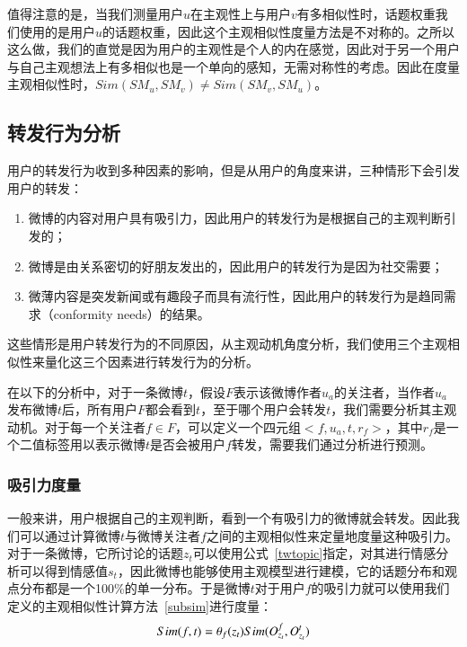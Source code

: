 值得注意的是，当我们测量用户$ u $在主观性上与用户$ v $有多相似性时，话题权重我们使用的是用户$ u $的话题权重，因此这个主观相似性度量方法是不对称的。之所以这么做，我们的直觉是因为用户的主观性是个人的内在感觉，因此对于另一个用户与自己主观想法上有多相似也是一个单向的感知，无需对称性的考虑。因此在度量主观相似性时，$ Sim(SM_u,SM_v)\neq Sim(SM_v,SM_u)$。

\subsection{转发行为分析}
\label{retweet}
用户的转发行为收到多种因素的影响，但是从用户的角度来讲，三种情形下会引发用户的转发：

\begin{enumerate}
\item 微博的内容对用户具有吸引力，因此用户的转发行为是根据自己的主观判断引发的；
\item 微博是由关系密切的好朋友发出的，因此用户的转发行为是因为社交需要；
\item 微薄内容是突发新闻或有趣段子而具有流行性，因此用户的转发行为是趋同需求（conformity needs）的结果。
\end{enumerate}
这些情形是用户转发行为的不同原因，从主观动机角度分析，我们使用三个主观相似性来量化这三个因素进行转发行为的分析。

在以下的分析中，对于一条微博$ t $，假设$ F $表示该微博作者$ u_{a} $的关注者，当作者$ u_{a} $发布微博$ t $后，所有用户$ F $都会看到$ t $，至于哪个用户会转发$ t $，我们需要分析其主观动机。对于每一个关注者$ f \in F $，可以定义一个四元组$ <f, u_{a}, t, r_{f}>  $，其中$ r_{f} $是一个二值标签用以表示微博$ t $是否会被用户$ f $转发，需要我们通过分析进行预测。

\subsubsection{吸引力度量}
一般来讲，用户根据自己的主观判断，看到一个有吸引力的微博就会转发。因此我们可以通过计算微博$ t $与微博关注者$ f $之间的主观相似性来定量地度量这种吸引力。对于一条微博，它所讨论的话题$ z_t $可以使用公式~\ref{twtopic}指定，对其进行情感分析可以得到情感值$ s_t $，因此微博也能够使用主观模型进行建模，它的话题分布和观点分布都是一个100\%的单一分布。于是微博$t$对于用户$f$的吸引力就可以使用我们定义的主观相似性计算方法~\ref{subsim}进行度量：
\begin{equation}
Sim(f,t)=\theta_{f}(z_t)\* Sim(O_{z_t}^{f},O_{z_t}^{t})
\end{equation}

